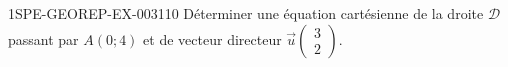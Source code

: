 \begin{exercice}{1SPE-GEOREP-EX-003}{1}{10}
Déterminer une équation cartésienne de la droite $\mathcal{D}$ passant par $A(0 ; 4)$ et de vecteur directeur $\vec{u}\begin{pmatrix} 3 \\ 2 \end{pmatrix}$.
\end{exercice}
